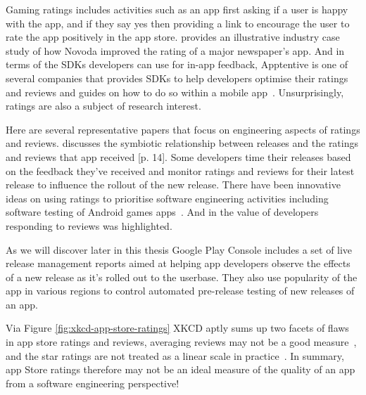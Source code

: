 Gaming ratings includes activities such as an app first asking if a user is happy with the app, and if they say yes then providing a link to encourage the user to rate the app positively in the app store. \citet{novoda_akan2016_asking_for_app_feedback_the_effective_way} provides an illustrative industry case study of how Novoda improved the rating of a major newspaper's app. And in terms of the SDKs developers can use for in-app feedback, Apptentive is one of several companies that provides SDKs to help developers optimise their ratings and reviews and guides on how to do so within a mobile app~\citep{walz2015_apptentive_the_mobile_marketers_guide_to_app_store_ratings_and_reviews}. Unsurprisingly, ratings are also a subject of research interest.

Here are several representative papers that focus on engineering aspects of ratings and reviews.  \citet{alsubaihin2019app_store_effects_on_software_engineering} discusses the symbiotic relationship between releases and the ratings and reviews that app received [p. 14]. Some developers time their releases based on the feedback they've received and monitor ratings and reviews for their latest release to influence the rollout of the new release. There have been innovative ideas on using ratings to prioritise software engineering activities including software testing of Android games apps~\citep{khalid2014_prioritizing_the_devices_to_test_your_app_on_casestudy_android_games}. And in \citet{greenheld2018_automating_developers_responses_to_app_reviews} the value of developers responding to reviews was highlighted. 

As we will discover later in this thesis Google Play Console includes a set of live release management reports aimed at helping app developers observe the effects of a new release as it's rolled out to the userbase. They also use popularity of the app in various regions to control automated pre-release testing of new releases of an app. 

Via Figure \ref{fig:xkcd-app-store-ratings} XKCD aptly sums up two facets of flaws in app store ratings and reviews, averaging reviews may not be a good measure~\citep{explainxkcd_937_tornadoguard}, and the star ratings are not treated as a linear scale in practice~\citep{explainxkcd_1098_star_ratings}. In summary, app Store ratings therefore may not be an ideal measure of the quality of an app from a software engineering perspective! 

